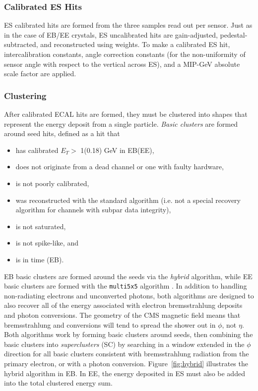\documentclass[dissertation.tex]{subfiles}
\begin{document}
\subsubsection{Calibrated ES Hits}
\label{sec:Calibrated ES Hits}

ES calibrated hits are formed from the three samples read out per sensor.  Just as in the case of EB/EE crystals, ES uncalibrated hits are gain-adjusted, pedestal-subtracted, and reconstructed using weights.  To make a calibrated ES hit, intercalibration constants, angle correction constants (for the non-uniformity of sensor angle with respect to the vertical across ES), and a MIP-GeV absolute scale factor are applied.

\subsubsection{Clustering}
\label{sec:Clustering}

After calibrated ECAL hits are formed, they must be clustered into shapes that represent the energy deposit from a single particle.  \textit{Basic clusters} are formed around seed hits, defined as a hit that

\begin{itemize}
\item has calibrated $E_{T} >$ 1(0.18) GeV in EB(EE),
\item does not originate from a dead channel or one with faulty hardware,
\item is not poorly calibrated,
\item was reconstructed with the standard algorithm (i.e. not a special recovery algorithm for channels with subpar data integrity),
\item is not saturated,
\item is not spike-like, and
\item is in time (EB).
\end{itemize}
%
EB basic clusters are formed around the seeds via the \textit{hybrid} algorithm, while EE basic clusters are formed with the \verb+multi5x5+ algorithm \cite{ECAL_SC_note}.  In addition to handling non-radiating electrons and unconverted photons, both algorithms are designed to also recover all of the energy associated with electron bremsstrahlung deposits and photon conversions.  The geometry of the CMS magnetic field means that bremsstrahlung and conversions will tend to spread the shower out in $\phi$, not $\eta$.  Both algorithms work by forming basic clusters around seeds, then combining the basic clusters into \textit{superclusters} (SC) by searching in a window extended in the $\phi$ direction for all basic clusters consistent with bremsstrahlung radiation from the primary electron, or with a photon conversion.  Figure~\ref{fig:hybrid} illustrates the hybrid algorithm in EB.  In EE, the energy deposited in ES must also be added into the total clustered energy sum.
\end{document}
